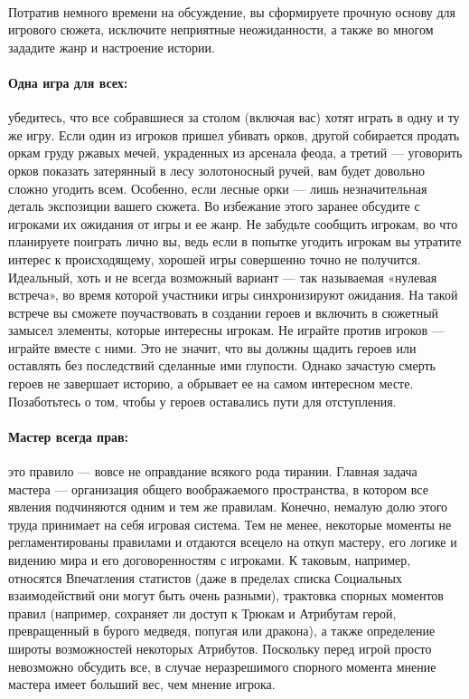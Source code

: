 \paragraph{}
Потратив немного времени на обсуждение, вы сформируете прочную основу для игрового сюжета, исключите неприятные
неожиданности, а также во многом зададите жанр и настроение
истории.
\paragraph{Одна игра для всех:} убедитесь, что все собравшиеся за столом (включая вас) хотят играть в одну и ту же игру. Если один из игроков пришел убивать орков, другой собирается продать оркам груду ржавых мечей, украденных из арсенала феода, а третий — уговорить орков показать затерянный в лесу золотоносный ручей, вам будет довольно сложно угодить всем. Особенно, если лесные орки — лишь незначительная деталь экспозиции вашего сюжета.
\newline
Во избежание этого заранее обсудите с игроками их ожидания
от игры и ее жанр. Не забудьте сообщить игрокам, во что планируете
поиграть лично вы, ведь если в попытке угодить игрокам вы утратите интерес к происходящему, хорошей игры совершенно точно не получится. Идеальный, хоть и не всегда возможный вариант — так называемая «нулевая встреча», во время которой участники игры синхронизируют ожидания. На такой встрече вы сможете поучаствовать в создании героев и включить в сюжетный замысел элементы, которые интересны игрокам.
\newline
Не играйте против игроков — играйте вместе с ними. Это
не значит, что вы должны щадить героев или оставлять без
последствий сделанные ими глупости. Однако зачастую смерть
героев не завершает историю, а обрывает ее на самом интересном
месте. Позаботьтесь о том, чтобы у героев оставались пути для
отступления.
\paragraph{Мастер всегда прав:} это правило — вовсе не оправдание всякого рода тирании. Главная задача мастера — организация общего воображаемого пространства, в котором все явления подчиняются одним и тем же правилам. Конечно, немалую долю этого труда принимает на себя игровая система. Тем не менее, некоторые моменты не регламентированы правилами и отдаются всецело на откуп мастеру, его логике и видению мира и его договоренностям с игроками. К таковым, например, относятся Впечатления статистов (даже в пределах списка Социальных взаимодействий они могут быть очень разными), трактовка спорных моментов правил (например, сохраняет ли доступ к Трюкам и Атрибутам герой, превращенный в бурого медведя, попугая или дракона), а также определение широты возможностей некоторых Атрибутов. Поскольку перед игрой просто невозможно обсудить все, в случае неразрешимого спорного момента мнение мастера имеет больший вес, чем мнение игрока.
